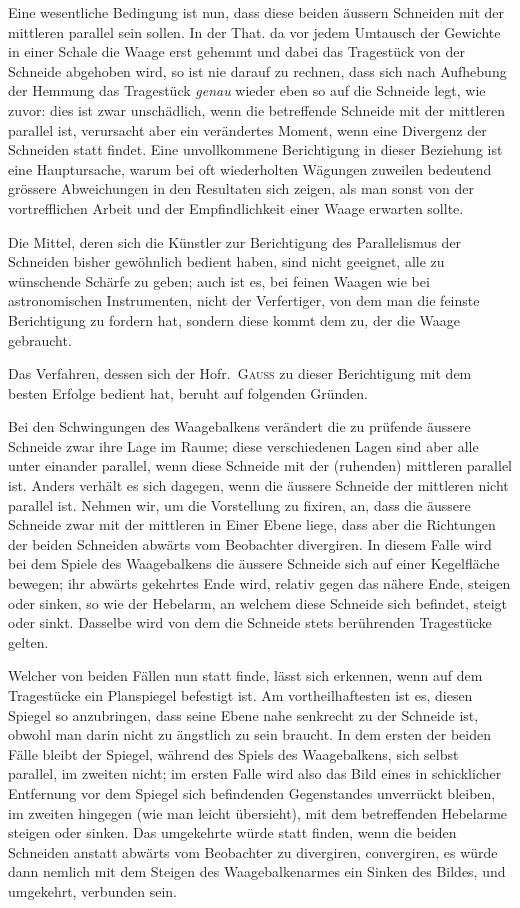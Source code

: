 Eine wesentliche Bedingung ist nun, dass diese beiden äussern Schneiden mit der mittleren parallel sein sollen. In der That. da vor jedem Umtausch der Gewichte in einer Schale die Waage erst gehemmt und dabei das Tragestück von der Schneide abgehoben wird, so ist nie darauf zu rechnen, dass sich nach Aufhebung der Hemmung das Tragestück \textit{genau} wieder eben so auf die Schneide legt, wie zuvor: dies ist zwar unschädlich, wenn die betreffende Schneide mit der mittleren parallel ist, verursacht aber ein verändertes Moment, wenn eine Divergenz der Schneiden statt findet. Eine unvollkommene Berichtigung in dieser Beziehung ist eine Hauptursache, warum bei oft wiederholten Wägungen zuweilen bedeutend grössere Abweichungen in den Resultaten sich zeigen, als man
sonst von der vortrefflichen Arbeit und der Empfindlichkeit einer Waage erwarten sollte.

Die Mittel, deren sich die Künstler zur Berichtigung des Parallelismus der Schneiden bisher gewöhnlich bedient haben, sind nicht geeignet, alle zu wünschende Schärfe zu geben; auch ist es, bei feinen Waagen wie bei astronomischen Instrumenten, nicht der Verfertiger, von dem man die feinste Berichtigung zu fordern hat, sondern diese kommt dem zu, der die Waage gebraucht.

Das Verfahren, dessen sich der Hofr.\ \textsc{Gauss} zu dieser Berichtigung mit dem besten Erfolge bedient hat, beruht auf folgenden Gründen.

Bei den Schwingungen des Waagebalkens verändert die zu prüfende äussere Schneide zwar ihre Lage im Raume; diese verschiedenen Lagen sind aber alle unter einander parallel, wenn diese Schneide mit der (ruhenden) mittleren parallel ist. Anders verhält es sich dagegen, wenn die äussere Schneide der mittleren nicht parallel ist. Nehmen wir, um die Vorstellung zu fixiren, an, dass die äussere Schneide zwar mit der mittleren in Einer Ebene liege, dass aber die Richtungen der beiden Schneiden abwärts vom Beobachter divergiren. In diesem Falle wird bei dem Spiele des Waagebalkens die äussere Schneide sich auf einer Kegelfläche bewegen; ihr abwärts gekehrtes Ende wird, relativ gegen das nähere Ende, steigen oder sinken, so wie der Hebelarm, an welchem diese Schneide sich befindet, steigt oder sinkt. Dasselbe wird von dem die Schneide stets berührenden Tragestücke gelten.

Welcher von beiden Fällen nun statt finde, lässt sich erkennen, wenn auf dem Tragestücke ein Planspiegel befestigt ist. Am vortheilhaftesten ist es, diesen Spiegel so anzubringen, dass seine Ebene nahe senkrecht zu der Schneide ist, obwohl man darin nicht zu ängstlich zu sein braucht. In dem ersten der beiden Fälle bleibt der Spiegel, während des Spiels des Waagebalkens, sich selbst parallel, im zweiten nicht; im ersten Falle wird also das Bild eines in schicklicher Entfernung vor dem Spiegel sich befindenden Gegenstandes unverrückt bleiben, im zweiten hingegen (wie man leicht übersieht), mit dem betreffenden Hebelarme steigen oder sinken. Das umgekehrte würde statt finden, wenn die beiden Schneiden anstatt abwärts vom Beobachter zu divergiren, convergiren, es würde dann nemlich mit dem Steigen des Waagebalkenarmes ein Sinken des Bildes, und umgekehrt, verbunden sein.

